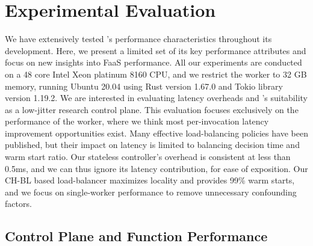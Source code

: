 \section{Experimental Evaluation}
\label{sec:ilu:eval}
We have extensively tested \sysname's performance characteristics throughout its development.
Here, we present a limited set of its key performance attributes and focus on new insights into FaaS performance.
All our experiments are conducted on a 48 core Intel Xeon platinum 8160 CPU, and we restrict the worker to 32 GB memory, running Ubuntu 20.04 using Rust version 1.67.0 and Tokio library version 1.19.2.
%
We are interested in evaluating latency overheads and \sysname's suitability as a low-jitter research control plane. 
This evaluation focuses exclusively on the performance of the worker, where we think most per-invocation latency improvement opportunities exist.
Many effective load-balancing policies have been published, but their impact on latency is limited to balancing decision time and warm start ratio.
Our stateless controller's overhead is consistent at less than 0.5ms, and we can thus ignore its latency contribution, for ease of exposition.
Our CH-BL based load-balancer maximizes locality and provides 99\% warm starts, and we focus on single-worker performance to remove unnecessary confounding factors.




\subsection{Control Plane and Function Performance}
\label{sec:ilu:eval:ovhead}

